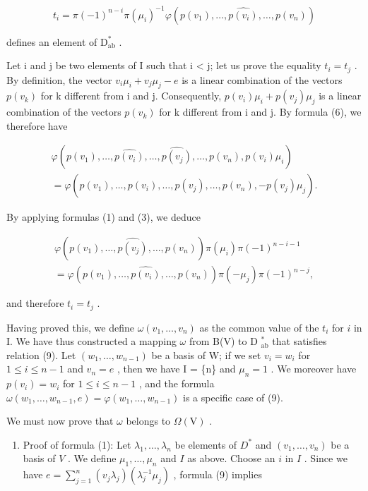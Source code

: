\[
t _ {i} = \pi (- 1) ^ {n - i} \pi (\mu_ {i}) ^ {- 1} \varphi (p (v _ {1}), \ldots , \widehat {p (v _ {i})}, \ldots , p (v _ {n}))\tag{10}
\]

defines an element of \(\mathrm{D}_{\mathrm{ab}}^{*}\) .

Let i and j be two elements of I such that i \textless{} j; let us prove the equality \(t_{i} = t_{j}\) . By definition, the vector \(v_{i}\mu_{i} + v_{j}\mu_{j} - e\) is a linear combination of the vectors \(p(v_{k})\) for k different from i and j. Consequently, \(p(v_{i})\mu_{i} + p(v_{j})\mu_{j}\) is a linear combination of the vectors \(p(v_{k})\) for k different from i and j. By formula (6), we therefore have

\[
\begin{array}{c} \varphi (p (v _ {1}), \ldots , \widehat {p (v _ {i})}, \ldots , \widehat {p (v _ {j})}, \ldots , p (v _ {n}), p (v _ {i}) \mu_ {i}) \\ = \varphi (p (v _ {1}), \ldots , \widehat {p (v _ {i})}, \ldots , \widehat {p (v _ {j})}, \ldots , p (v _ {n}), - p (v _ {j}) \mu_ {j}). \end{array}
\]

By applying formulas (1) and (3), we deduce

\[
\begin{array}{c} \varphi (p (v _ {1}), \ldots , \widehat {p (v _ {j})}, \ldots , p (v _ {n})) \pi (\mu_ {i}) \pi (- 1) ^ {n - i - 1} \\ = \varphi (p (v _ {1}), \ldots , \widehat {p (v _ {i})}, \ldots , p (v _ {n})) \pi (- \mu_ {j}) \pi (- 1) ^ {n - j}, \end{array}
\]

and therefore \(t_i = t_j\) .

Having proved this, we define \(\omega(v_1, \ldots, v_n)\) as the common value of the \(t_i\) for \(i\) in I. We have thus constructed a mapping \(\omega\) from B(V) to D \(_{\text{ab}}^*\) that satisfies relation (9). Let \((w_1, \ldots, w_{n-1})\) be a basis of W; if we set \(v_i = w_i\) for \(1 \leqslant i \leqslant n-1\) and \(v_n = e\) , then we have I = \{n\} and \(\mu_n = 1\) . We moreover have \(p(v_i) = w_i\) for \(1 \leqslant i \leqslant n-1\) , and the formula \(\omega(w_1, \ldots, w_{n-1}, e) = \varphi(w_1, \ldots, w_{n-1})\) is a specific case of (9).

We must now prove that \(\omega\) belongs to \(\Omega (\mathrm{V})\) .

\begin{enumerate}
\def\labelenumi{\Alph{enumi})}
\setcounter{enumi}{2}
\tightlist
\item
  Proof of formula (1): Let \(\lambda_1, \ldots, \lambda_n\) be elements of \(D^*\) and \((v_1, \ldots, v_n)\) be a basis of \(V\) . We define \(\mu_1, \ldots, \mu_n\) and \(I\) as above. Choose an \(i\) in \(I\) . Since we have \(e = \sum_{j=1}^{n} (v_j \lambda_j)(\lambda_j^{-1} \mu_j)\) , formula (9) implies
\end{enumerate}

